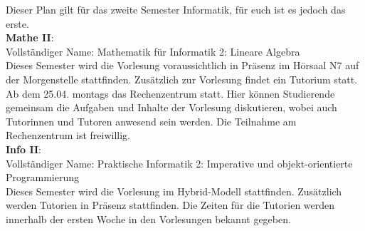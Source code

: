 \noindent Dieser Plan gilt für das zweite Semester Informatik, für euch ist es jedoch das erste.\\
\textbf{Mathe II}:\\
Vollständiger Name: Mathematik für Informatik 2: Lineare Algebra\\
Dieses Semester wird die Vorlesung voraussichtlich in Präsenz im Hörsaal N7 auf der Morgenstelle stattfinden.
Zusätzlich zur Vorlesung findet ein Tutorium statt. \\
Ab dem 25.04. montags das Rechenzentrum statt. Hier können Studierende gemeinsam die Aufgaben und Inhalte der Vorlesung diskutieren,
wobei auch Tutorinnen und Tutoren anwesend sein werden. Die Teilnahme am Rechenzentrum ist freiwillig.\\

\textbf{Info II}:\\
Vollständiger Name: Praktische Informatik 2: Imperative und objekt-orientierte Programmierung\\
Dieses Semester wird die Vorlesung im Hybrid-Modell stattfinden. Zusätzlich werden Tutorien in Präsenz stattfinden.
Die Zeiten für die Tutorien werden innerhalb der ersten Woche in den Vorlesungen bekannt gegeben.\\

